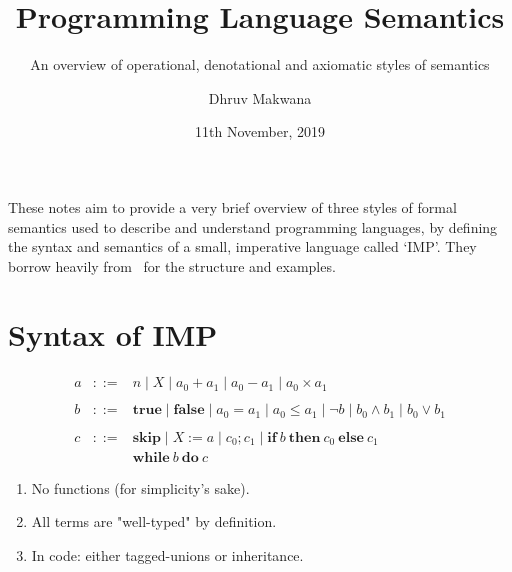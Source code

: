 \usepackage{proof}
\usepackage{ebproof}
\usepackage{listings}

\title{Programming Language Semantics}
\subtitle{An overview of operational, denotational and axiomatic styles of semantics}
\date{11th November, 2019}
\author{Dhruv Makwana}

\graphicspath{{./graphics/}}


\addtolength{\jot}{0.5\baselineskip}

\newcommand{\den}[2]{ \mathcal{#1} [\![ #2 ]\!] }%
\newcommand{\denA}[1]{ \den{A}{#1} }%
\newcommand{\denB}[1]{ \den{B}{#1} }%
\newcommand{\denC}[1]{ \den{C}{#1} }%



\maketitle

\mode*  %

These notes aim to provide a very brief overview of three styles of formal
semantics used to describe and understand programming languages, by
defining the syntax and semantics of a small, imperative language called `IMP'.
They borrow heavily from~\citet{winskel1993formal} for the structure and
examples.

\section{Syntax of IMP}

\begin{frame}
    \[\begin{array}{rcl}
        a & ::= & n
                \mid X
                \mid a_0 + a_1
                \mid a_0 - a_1
                \mid a_0 \times a_1 \\
                \\
        b & ::= & \mathbf{true}
                \mid \mathbf{false}
                \mid a_0 = a_1
                \mid a_0 \leq a_1
                \mid \neg b
                \mid b_0 \wedge b_1
                \mid b_0 \vee b_1 \\
                \\
        c & ::= & \mathbf{skip}
                \mid X := a
                \mid c_0; c_1
                \mid \mathbf{if}\ b\ \mathbf{then}\ c_0\ \mathbf{else}\ c_1 \\
                && \mathbf{while}\ b\ \mathbf{do}\ c
    \end{array} \]
    \pause
    \begin{enumerate}
        \item No functions (for simplicity's sake).
        \item All terms are "well-typed" by definition.
        \item In code: either tagged-unions or inheritance.
    \end{enumerate}
\end{frame}

